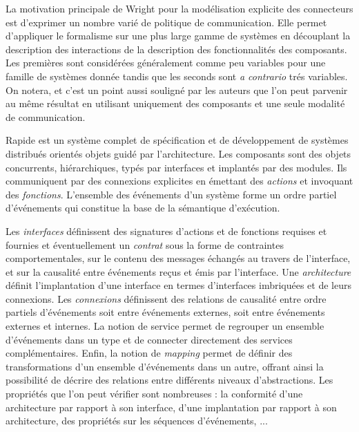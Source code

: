 La motivation principale de \textsf{Wright} pour la
mod\'elisation explicite des connecteurs est d'exprimer
un nombre vari\'e de politique de communication. Elle
permet d'appliquer le formalisme sur une plus large gamme de syst\`emes en
d\'ecouplant la description des interactions de la description des
fonctionnalit\'es des composants. Les premi\`eres sont  
consid\'er\'ees g\'en\'eralement comme peu variables pour une
famille de syst\`emes donn\'ee  tandis que les seconds sont \emph{a
contrario} tr\'es variables. On notera, et c'est un point
aussi soulign\'e par les auteurs que l'on peut parvenir au m\^eme
r\'esultat en utilisant uniquement des composants et une seule
modalit\'e de communication.

Rapide \cite{rapide} est un syst\`eme complet de sp\'ecification et
de d\'eveloppement de syst\`emes distribu\'es orient\'es objets
guid\'e par l'architecture. Les composants sont des objets
concurrents, hi\'erarchiques, typ\'es par interfaces et implant\'es
par des modules. Ils communiquent par des connexions explicites en
\'emettant des \emph{actions} et invoquant des
\emph{fonctions}. L'ensemble des \'ev\'enements d'un syst\`eme
forme un ordre partiel d'\'ev\'enements qui constitue la base de la
s\'emantique d'ex\'ecution. 

Les  \emph{interfaces}  d\'efinissent des signatures d'actions et de
fonctions requises et fournies et \'eventuellement un \emph{contrat}
sous la forme de contraintes comportementales, sur le contenu des
messages \'echang\'es au travers de l'interface, et sur la
causalit\'e entre \'ev\'enements re\c{c}us et \'emis par
l'interface. Une \emph{architecture} d\'efinit l'implantation
d'une interface en termes d'interfaces imbriqu\'ees et de leurs connexions. Les \emph{connexions}
d\'efinissent des relations de causalit\'e entre ordre partiels
d'\'ev\'enements soit entre \'ev\'enements externes, soit entre
\'ev\'enements externes et internes. La notion de service permet de
regrouper un ensemble d'\'ev\'enements dans un type et de connecter directement
des services compl\'ementaires. Enfin, la notion de \emph{mapping}
permet de d\'efinir des transformations d'un ensemble
d'\'ev\'enements dans un autre, offrant ainsi la possibilit\'e de
d\'ecrire des relations entre diff\'erents niveaux d'abstractions.
Les propri\'et\'es que l'on peut v\'erifier sont nombreuses : la conformit\'e d'une architecture par rapport \`a son
interface, d'une implantation par rapport \`a son architecture, des
propri\'et\'es sur les s\'equences d'\'ev\'enements, ...

